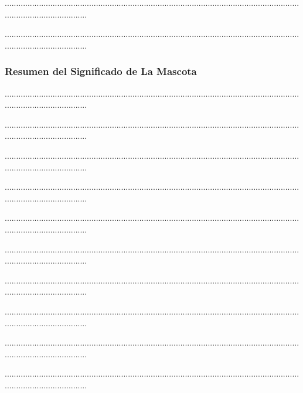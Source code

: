 \documentclass{article}
\begin{document}
.....................................................................................................................................................................

.....................................................................................................................................................................



\subsubsection{Resumen del Significado de La Mascota}

.....................................................................................................................................................................

.....................................................................................................................................................................

.....................................................................................................................................................................

.....................................................................................................................................................................

.....................................................................................................................................................................

.....................................................................................................................................................................

.....................................................................................................................................................................

.....................................................................................................................................................................

.....................................................................................................................................................................

.....................................................................................................................................................................
\end{document}
